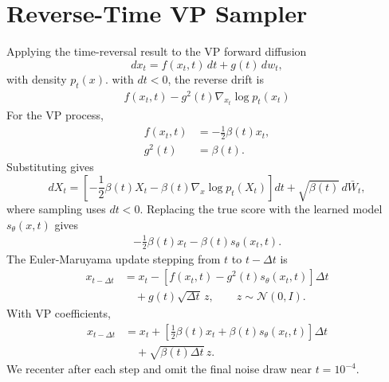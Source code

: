 \documentclass[reprint,amsmath,amssymb,aps,pra,10pt]{revtex4-2}
\begin{document}
\section{Reverse-Time VP Sampler}

Applying the time-reversal result to the VP forward diffusion
\begin{equation}
    dx_t
    =
    f(x_t,t)\,dt
    +
    g(t)\,dw_t,
\end{equation}
with density $p_t(x)$.
with $dt<0$, the reverse drift is
\begin{equation}
    \begin{aligned}
        f(x_t,t)
        -
        g^2(t)
        \nabla_{x_t}\log p_t(x_t)
    \end{aligned}
\end{equation}
For the VP process,
\begin{equation}
    \begin{aligned}
        f(x_t,t)
        &=
        -\frac{1}{2}\beta(t)x_t,
        \\
        g^2(t)
        &=
        \beta(t).
    \end{aligned}
\end{equation}
Substituting gives
\begin{equation}
    dX_t
    =
    \left[
        -\frac{1}{2}\beta(t)X_t
        -
        \beta(t)\nabla_x\log p_t(X_t)
    \right]dt
    +
    \sqrt{\beta(t)}\,d\bar W_t,
\end{equation}
where sampling uses $dt<0$.
Replacing the true score with the learned model $s_\theta(x,t)$ gives
\begin{equation}
    \begin{aligned}
        -\frac{1}{2}\beta(t)x_t
        -
        \beta(t)s_\theta(x_t,t).
    \end{aligned}
\end{equation}
The Euler-Maruyama update stepping from $t$ to $t-\Delta t$ is
\begin{align}
    x_{t-\Delta t}
    &=
    x_t
    -
    \left[
        f(x_t,t)
        -
        g^2(t)s_\theta(x_t,t)
    \right]\Delta t
    \nonumber \\
    &\quad
    +
    g(t)\sqrt{\Delta t}\,z,
    \qquad
    z\sim\mathcal{N}(0,I).
\end{align}
With VP coefficients,
\begin{align}
    x_{t-\Delta t}
    &=
    x_t
    +
    \left[
        \frac{1}{2}\beta(t)x_t
        +
        \beta(t)s_\theta(x_t,t)
    \right]\Delta t
    \nonumber \\
    &\quad
    +
    \sqrt{\beta(t)\Delta t}\,z.
\end{align}
We recenter after each step and omit the final noise draw near $t=10^{-4}$.

\clearpage


\end{document}
